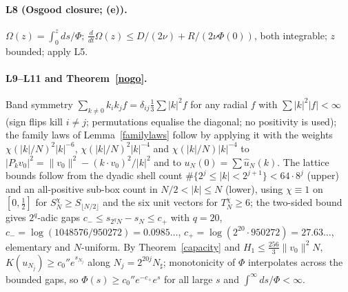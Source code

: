 \documentclass[11pt]{article}
\theoremstyle{definition}
\begin{document}
\paragraph{L8 (Osgood closure; (e)).}
$\Omega(z)=\int_0^zds/\Phi$;
$\frac{d}{dt}\Omega(z)\le D/(2\nu)+R/(2\nu\Phi(0))$, both integrable;
$z$ bounded; apply L5.

\paragraph{L9--L11 and Theorem~\ref{nogo}.}
Band symmetry $\sum_{k\neq0}k_ik_jf=\delta_{ij}\tfrac13\sum|k|^2f$ for
any radial $f$ with $\sum|k|^2|f|<\infty$ (sign flips kill $i\neq j$;
permutations equalise the diagonal; no positivity is used); the family
laws of Lemma~\ref{familylaws} follow by applying it with the weights
$\chi(|k|/N)^2|k|^{-6}$, $\chi(|k|/N)^2|k|^{-4}$ and
$\chi(|k|/N)|k|^{-4}$ to
$|P_kv_0|^2=\|v_0\|^2-(k\cdot v_0)^2/|k|^2$ and to
$u_N(0)=\sum\hat u_N(k)$. The lattice bounds follow from the dyadic
shell count $\#\{2^j\le|k|<2^{j+1}\}<64\cdot8^j$ (upper) and an
all-positive sub-box count in $N/2<|k|\le N$ (lower), using
$\chi\equiv1$ on $[0,\tfrac12]$ for $S_N^\chi\ge S_{\lfloor N/2\rfloor}$
and the six unit vectors for $T_N^\chi\ge6$; the two-sided bound gives
$2^q$-adic gaps $c_-\le s_{2^qN}-s_N\le c_+$ with $q=20$,
$c_-=\log(1048576/950272)=0.0985\ldots$,
$c_+=\log(2^{20}\cdot950272)=27.63\ldots$, elementary and $N$-uniform.
By Theorem~\ref{capacity} and $H_1\le\tfrac{256}{3}\|v_0\|^2N$,
$K(u_{N_j})\ge c_0''e^{s_{N_j}}$ along $N_j=2^{20j}N_\sharp$;
monotonicity of $\Phi$ interpolates across the bounded gaps, so
$\Phi(s)\ge c_0''e^{-c_+}e^{s}$ for all large $s$ and
$\int^\infty ds/\Phi<\infty$.
\end{document}
